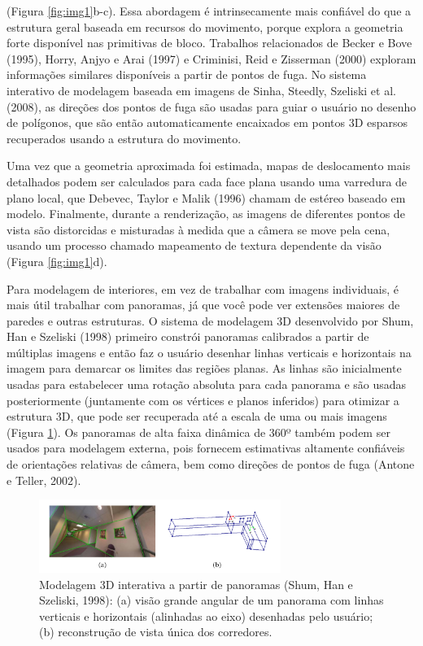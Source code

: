 \documentclass{article}
\begin{document}
(Figura \ref{fig:img1}b-c). Essa abordagem é intrinsecamente mais confiável do que a estrutura geral baseada em recursos do movimento, porque explora a geometria forte disponível nas primitivas de bloco. Trabalhos relacionados de Becker e Bove (1995)\cite{Becker}, Horry, Anjyo e Arai (1997)\cite{Horry:1997:TPU:258734.258854} e Criminisi, Reid e Zisserman (2000)\cite{Criminisi00a} exploram informações similares disponíveis a partir de pontos de fuga. No sistema interativo de modelagem baseada em imagens de Sinha, Steedly, Szeliski et al. (2008)\cite{Sinha:2008:IAM:1409060.1409112}, as direções dos pontos de fuga são usadas para guiar o usuário no desenho de polígonos, que são então automaticamente encaixados em pontos 3D esparsos recuperados usando a estrutura do movimento.

Uma vez que a geometria aproximada foi estimada, mapas de deslocamento mais detalhados podem ser calculados para cada face plana usando uma varredura de plano local, que Debevec, Taylor e Malik (1996)\cite{Debevec:1996:MRA:237170.237191} chamam de estéreo baseado em modelo. Finalmente, durante a renderização, as imagens de diferentes pontos de vista são distorcidas e misturadas à medida que a câmera se move pela cena, usando um processo chamado mapeamento de textura dependente da visão (Figura \ref{fig:img1}d).

Para modelagem de interiores, em vez de trabalhar com imagens individuais, é mais útil trabalhar com panoramas, já que você pode ver extensões maiores de paredes e outras estruturas. O sistema de modelagem 3D desenvolvido por Shum, Han e Szeliski (1998)\cite{Shum1998InteractiveCO} primeiro constrói panoramas calibrados a partir de múltiplas imagens e então faz o usuário desenhar linhas verticais e horizontais na imagem para demarcar os limites das regiões planas. As linhas são inicialmente usadas para estabelecer uma rotação absoluta para cada panorama e são usadas posteriormente (juntamente com os vértices e planos inferidos) para otimizar a estrutura 3D, que pode ser recuperada até a escala de uma ou mais imagens (Figura \ref{fig:img2}). Os panoramas de alta faixa dinâmica de 360º também podem ser usados para modelagem externa, pois fornecem estimativas altamente confiáveis de orientações relativas de câmera, bem como direções de pontos de fuga (Antone e Teller, 2002)\cite{Antone:2002:SEC:598434.598520}.

\begin{figure}[!htb]
    \centering
    \includegraphics[width=0.7\textwidth]{img2.png}
    \caption{Modelagem 3D interativa a partir de panoramas (Shum, Han e Szeliski, 1998)\cite{Shum1998InteractiveCO}: (a) visão grande angular de um panorama com linhas verticais e horizontais (alinhadas ao eixo) desenhadas pelo usuário; (b) reconstrução de vista única dos corredores.}
    \label{fig:img2}
\end{figure}
\end{document}
